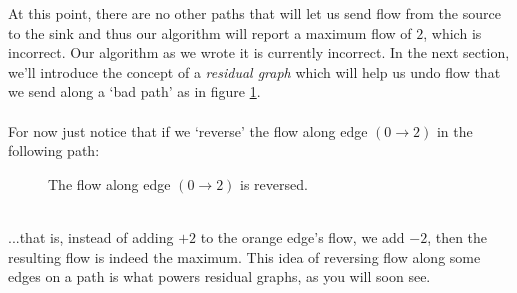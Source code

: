 \documentclass[11pt]{article}
\theoremstyle{plain}
\theoremstyle{definition}
\begin{document}
\noindent At this point, there are no other paths that will let us send flow from the source to the sink and thus our algorithm will report a maximum flow of $2$, which is incorrect. Our algorithm as we wrote it is currently incorrect. In the next section, we'll introduce the concept of a \emph{residual graph} which will help us undo flow that we send along a `bad path' as in figure \ref{fig:bad}.
\\\\
\noindent For now just notice that if we `reverse' the flow along edge $(0 \rightarrow 2)$ in the following path:
\begin{figure}[!ht]
\label{fig:bad}
\caption{The flow along edge $(0 \rightarrow 2)$ is reversed.}
\centering
{}
\end{figure}
\\
...that is, instead of adding $+2$ to the orange edge's flow, we add $-2$, then the resulting flow is indeed the maximum. This idea of reversing flow along some edges on a path is what powers residual graphs, as you will soon see.
\end{document}
